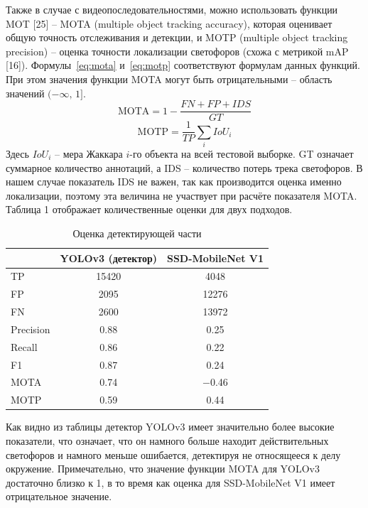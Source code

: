 \documentclass{misisarticle}
\begin{document}
Также в случае с видеопоследовательностями, можно использовать функции MOT [25] – MOTA (multiple object tracking accuracy), которая оценивает общую точность отслеживания и детекции, и MOTP (multiple object tracking precision) – оценка точности локализации светофоров (схожа с метрикой mAP [16]). Формулы~\eqref{eq:mota} и~\eqref{eq:motp} соответствуют формулам данных функций. При этом значения функции MOTA могут быть отрицательными – область значений $(-\infty,\, 1]$.
\begin{equation}
  \label{eq:mota}
  \mathrm{MOTA} = 1 - \frac{FN + FP + IDS}{GT}
\end{equation}
\begin{equation}
  \label{eq:motp}
  \mathrm{MOTP} = \frac{1}{TP}\sum_{i} IoU_i
\end{equation}
Здесь $IoU_i$ – мера Жаккара $i$-го объекта на всей тестовой выборке. GT означает суммарное количество аннотаций, а IDS – количество потерь трека светофоров. В нашем случае показатель IDS не важен, так как производится оценка именно локализации, поэтому эта величина не участвует при расчёте показателя MOTA. Таблица 1 отображает количественные оценки для двух подходов.

\begin{table}[htbp]
  \caption{Оценка детектирующей части}
  \label{tab:detector}
  \centering
  \begin{tabular}{lcc}
    \toprule
    & YOLOv3 (детектор) & SSD-MobileNet V1 \\
    \midrule
    TP & 15420 & 4048 \\
    FP & 2095 & 12276 \\
    FN & 2600 & 13972 \\
    Precision & 0.88 & 0.25 \\
    Recall & 0.86 & 0.22 \\
    F1 & 0.87 & 0.24 \\
    MOTA & 0.74 & $-$0.46 \\
    MOTP & 0.59 & 0.44 \\
    \bottomrule
  \end{tabular}
\end{table}

Как видно из таблицы детектор YOLOv3 имеет значительно более высокие показатели, что означает, что он намного больше находит действительных светофоров и намного меньше ошибается, детектируя не относящееся к делу окружение. Примечательно, что значение функции MOTA для YOLOv3 достаточно близко к 1, в то время как оценка для SSD-MobileNet V1 имеет отрицательное значение.
\end{document}
